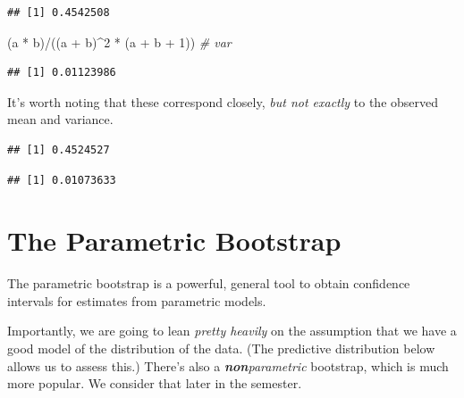 \documentclass[
]{book}
\newenvironment{Shaded}{\begin{snugshade}}{\end{snugshade}}
\newcommand{\CommentTok}[1]{\textcolor[rgb]{0.56,0.35,0.01}{\textit{#1}}}
\newcommand{\DecValTok}[1]{\textcolor[rgb]{0.00,0.00,0.81}{#1}}
\newcommand{\FunctionTok}[1]{\textcolor[rgb]{0.00,0.00,0.00}{#1}}
\newcommand{\NormalTok}[1]{#1}
\newcommand{\SpecialCharTok}[1]{\textcolor[rgb]{0.00,0.00,0.00}{#1}}
\begin{document}
\begin{verbatim}
## [1] 0.4542508
\end{verbatim}

\begin{Shaded}
\begin{Highlighting}[]
\NormalTok{(a }\SpecialCharTok{*}\NormalTok{ b)}\SpecialCharTok{/}\NormalTok{((a }\SpecialCharTok{+}\NormalTok{ b)}\SpecialCharTok{\^{}}\DecValTok{2} \SpecialCharTok{*}\NormalTok{ (a }\SpecialCharTok{+}\NormalTok{ b }\SpecialCharTok{+} \DecValTok{1}\NormalTok{))  }\CommentTok{\# var}
\end{Highlighting}
\end{Shaded}

\begin{verbatim}
## [1] 0.01123986
\end{verbatim}

It's worth noting that these correspond closely, \emph{but not exactly} to the observed mean and variance.

\begin{Shaded}
\end{Shaded}

\begin{verbatim}
## [1] 0.4524527
\end{verbatim}

\begin{Shaded}
\end{Shaded}

\begin{verbatim}
## [1] 0.01073633
\end{verbatim}

\hypertarget{the-parametric-bootstrap}{%
\section{The Parametric Bootstrap}\label{the-parametric-bootstrap}}

The parametric bootstrap is a powerful, general tool to obtain confidence intervals for estimates from parametric models.

Importantly, we are going to lean \emph{pretty heavily} on the assumption that we have a good model of the distribution of the data. (The predictive distribution below allows us to assess this.) There's also a \emph{\textbf{non}parametric} bootstrap, which is much more popular. We consider that later in the semester.
\end{document}
